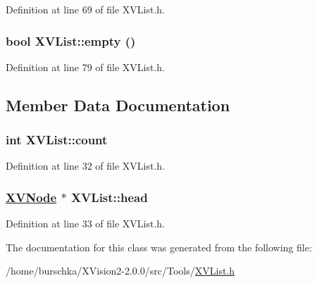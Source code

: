 Definition at line 69 of file XVList.h.\label{XVList_a5}
\hypertarget{class_XVList_a5}{
\subsubsection[empty]{\setlength{\rightskip}{0pt plus 5cm}bool XVList::empty ()}}




Definition at line 79 of file XVList.h.

\subsection{Member Data Documentation}
\label{XVList_n0}
\hypertarget{class_XVList_n0}{
\subsubsection[count]{\setlength{\rightskip}{0pt plus 5cm}int XVList::count}}




Definition at line 32 of file XVList.h.\label{XVList_n1}
\hypertarget{class_XVList_n1}{
\subsubsection[head]{\setlength{\rightskip}{0pt plus 5cm}\hyperlink{class_XVNode}{XVNode} $\ast$ XVList::head}}




Definition at line 33 of file XVList.h.

The documentation for this class was generated from the following file:\begin{CompactItemize}
\item 
/home/burschka/XVision2-2.0.0/src/Tools/\hyperlink{XVList.h-source}{XVList.h}\end{CompactItemize}
